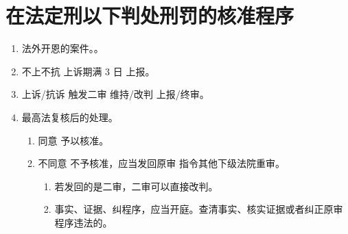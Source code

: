 \section{在法定刑以下判处刑罚的核准程序}
\begin{enumerate}
  \item 法外开恩的案件。。
  \item 不上不抗 \yjt 上诉期满 3 日 \yjt 上报。
  \item 上诉/抗诉 \yjt 触发二审 \yjt 维持/改判 \yjt 上报/终审。
  \item 最高法复核后的处理。
        \begin{enumerate}
          \item 同意 \yjt 予以核准。
          \item 不同意 \yjt 不予核准，应当发回原审 \hz 指令其他下级法院重审。
                \begin{enumerate}
                  \item 若发回的是二审，二审可以直接改判。
                  \item 事实、证据、纠程序，应当开庭。查清事实、核实证据或者纠正原审程序违法的。
                \end{enumerate}
        \end{enumerate}
\end{enumerate}

